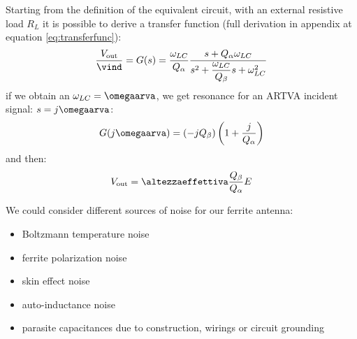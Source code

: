 Starting from the definition of the equivalent circuit, with an external resistive load $R_L$ it is possible to derive a transfer function (full derivation in appendix at equation \ref{eq:transferfunc}):
\begin{equation}
\dfrac{V_{\mathrm{out}}}{\vind} = G(s) = \dfrac{\omega_{LC}}{Q_{\alpha}} \dfrac{s + Q_{\alpha} \omega_{LC}}{s^2 + \dfrac{\omega_{LC}}{Q_{\beta}} s + \omega_{LC}^2}
\end{equation}
if we obtain an ${\omega_{LC} = \omegaarva}$, we get resonance for an ARTVA incident signal: ${s=j\omegaarva}$:
\begin{equation}
G(j\omegaarva) = \left( -j Q_{\beta} \right) \left( 1 + \dfrac{j}{Q_{\alpha}} \right)
\end{equation} 
and then:
\begin{equation}
V_{\mathrm{out}} = \altezzaeffettiva \dfrac{Q_{\beta}}{Q_{\alpha}} E
\end{equation}

We could consider different sources of noise for our ferrite antenna:
\begin{itemize}
\item Boltzmann temperature noise
\item ferrite polarization noise
\item skin effect noise
\item auto-inductance noise
\item parasite capacitances due to construction, wirings or circuit grounding
\end{itemize}

